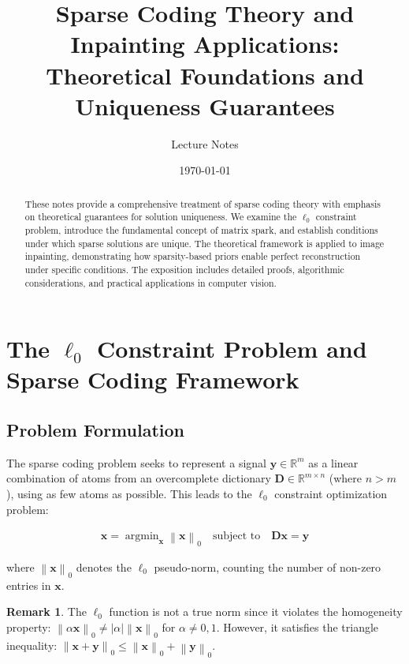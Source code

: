 \documentclass[12pt]{article}
\title{Sparse Coding Theory and Inpainting Applications: \\ Theoretical Foundations and Uniqueness Guarantees}
\author{Lecture Notes}
\date{\today}
\renewcommand{\vec}[1]{\mathbf{#1}}
\DeclareMathOperator{\argmin}{argmin}
\newcommand{\zeronorm}[1]{\left\|#1\right\|_0}
\newcommand{\Real}{\mathbb{R}}
\theoremstyle{definition}
\newtheorem{remark}[theorem]{Remark}
\begin{document}
\maketitle

\begin{abstract}
    These notes provide a comprehensive treatment of sparse coding theory with emphasis on theoretical guarantees for solution uniqueness. We examine the $\ell_0$ constraint problem, introduce the fundamental concept of matrix spark, and establish conditions under which sparse solutions are unique. The theoretical framework is applied to image inpainting, demonstrating how sparsity-based priors enable perfect reconstruction under specific conditions. The exposition includes detailed proofs, algorithmic considerations, and practical applications in computer vision.
\end{abstract}

\tableofcontents

\newpage

\section{The $\ell_0$ Constraint Problem and Sparse Coding Framework}

\subsection{Problem Formulation}

The sparse coding problem seeks to represent a signal $\vec{y} \in \Real^m$ as a linear combination of atoms from an overcomplete dictionary $\mathbf{D} \in \Real^{m \times n}$ (where $n > m$), using as few atoms as possible. This leads to the $\ell_0$ constraint optimization problem:

\begin{align}
    \label{eq:l0_problem}
    \hat{\vec{x}} = \argmin_{\vec{x}} \zeronorm{\vec{x}} \quad \text{subject to} \quad \mathbf{D}\vec{x} = \vec{y}
\end{align}

where $\zeronorm{\vec{x}}$ denotes the $\ell_0$ pseudo-norm, counting the number of non-zero entries in $\vec{x}$.

\begin{remark}
    The $\ell_0$ function is not a true norm since it violates the homogeneity property: $\zeronorm{\alpha \vec{x}} \neq |\alpha| \zeronorm{\vec{x}}$ for $\alpha \neq 0, 1$. However, it satisfies the triangle inequality: $\zeronorm{\vec{x} + \vec{y}} \leq \zeronorm{\vec{x}} + \zeronorm{\vec{y}}$.
\end{remark}
\end{document}
